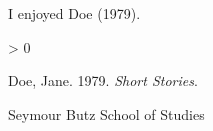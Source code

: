 
%
\newlength{\cslhangindent}
\setlength{\cslhangindent}{1.5em}
\newlength{\csllabelwidth}
\setlength{\csllabelwidth}{3em}
\newenvironment{CSLReferences}[2] %
 {%
  \setlength{\parindent}{0pt}
  \ifodd #1 \everypar{\setlength{\hangindent}{\cslhangindent}}\ignorespaces\fi
  \ifnum #2 > 0
  \setlength{\parskip}{#2\baselineskip}
  \fi
 }%
 {}
\usepackage{calc}
\newcommand{\CSLBlock}[1]{#1\hfill\break}
\newcommand{\CSLLeftMargin}[1]{\parbox[t]{\csllabelwidth}{#1}}
\newcommand{\CSLRightInline}[1]{\parbox[t]{\linewidth - \csllabelwidth}{#1}\break}
\newcommand{\CSLIndent}[1]{\hspace{\cslhangindent}#1}



I enjoyed Doe (1979).

\hypertarget{refs}{}
\begin{CSLReferences}{1}{0}
\leavevmode\hypertarget{ref-Doe}{}%
Doe, Jane. 1979. \emph{Short Stories}.

\end{CSLReferences}

Seymour Butz
School of Studies





%





